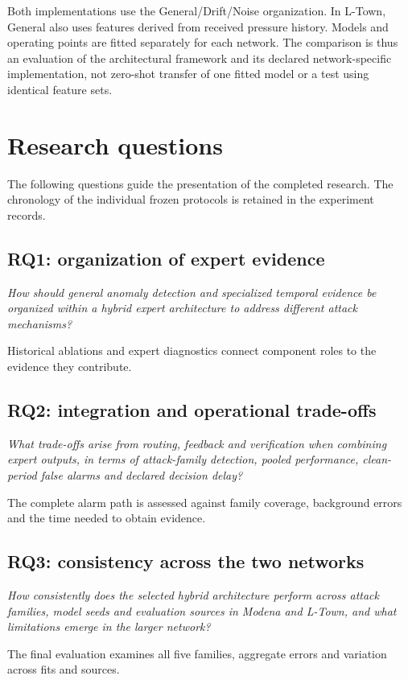 Both implementations use the General/Drift/Noise organization. In L-Town, General also uses features derived from received pressure history. Models and operating points are fitted separately for each network. The comparison is thus an evaluation of the architectural framework and its declared network-specific implementation, not zero-shot transfer of one fitted model or a test using identical feature sets.

\section{Research questions}
The following questions guide the presentation of the completed research. The chronology of the individual frozen protocols is retained in the experiment records.

\subsection{RQ1: organization of expert evidence}
\textit{How should general anomaly detection and specialized temporal evidence be organized within a hybrid expert architecture to address different attack mechanisms?}

Historical ablations and expert diagnostics connect component roles to the evidence they contribute.

\subsection{RQ2: integration and operational trade-offs}
\textit{What trade-offs arise from routing, feedback and verification when combining expert outputs, in terms of attack-family detection, pooled performance, clean-period false alarms and declared decision delay?}

The complete alarm path is assessed against family coverage, background errors and the time needed to obtain evidence.

\subsection{RQ3: consistency across the two networks}
\textit{How consistently does the selected hybrid architecture perform across attack families, model seeds and evaluation sources in Modena and L-Town, and what limitations emerge in the larger network?}

The final evaluation examines all five families, aggregate errors and variation across fits and sources.

